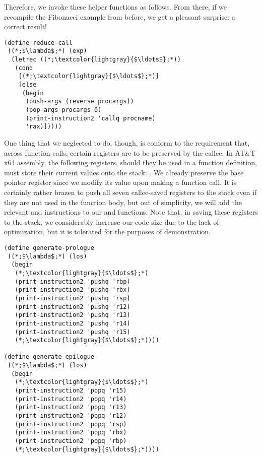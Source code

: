 Therefore, we invoke these helper functions as follows. From there, if we recompile the Fibonacci example from before, we get a pleasant surprise: a correct result!

\begin{cl}[]{}\begin{lstlisting}[language=MyScheme]
(define reduce-call
 ((*;$\lambda$;*) (exp)
  (letrec ((*;\textcolor{lightgray}{$\ldots$};*))
   (cond
    [(*;\textcolor{lightgray}{$\ldots$};*)]
    [else 
     (begin
      (push-args (reverse procargs))
      (pop-args procargs 0)
      (print-instruction2 'callq procname)
      'rax)]))))
\end{lstlisting}\end{cl}

One thing that we neglected to do, though, is conform to the requirement that, across function calls, certain registers are to be preserved by the callee. In AT\&T x64 assembly, the following registers, should they be used in a function definition, must store their current values onto the stack: . We already preserve the base pointer register since we modify its value upon making a function call. It is certainly rather brazen to push all seven callee-saved registers to the stack even if they are not used in the function body, but out of simplicity, we will add the relevant  and  instructions to our  and  functions. Note that, in saving these registers to the stack, we considerably increase our code size due to the lack of optimization, but it is tolerated for the purposes of demonstration.

\begin{cl}[]{}
\begin{lstlisting}[language=MyScheme]
(define generate-prologue
 ((*;$\lambda$;*) (los)
  (begin
   (*;\textcolor{lightgray}{$\ldots$};*)
   (print-instruction2 'pushq 'rbp)
   (print-instruction2 'pushq 'rbx)
   (print-instruction2 'pushq 'rsp)
   (print-instruction2 'pushq 'r12)
   (print-instruction2 'pushq 'r13)
   (print-instruction2 'pushq 'r14)
   (print-instruction2 'pushq 'r15)
   (*;\textcolor{lightgray}{$\ldots$};*))))

(define generate-epilogue
 ((*;$\lambda$;*) (los)
  (begin
   (*;\textcolor{lightgray}{$\ldots$};*)      
   (print-instruction2 'popq 'r15)
   (print-instruction2 'popq 'r14)
   (print-instruction2 'popq 'r13)
   (print-instruction2 'popq 'r12)
   (print-instruction2 'popq 'rsp)
   (print-instruction2 'popq 'rbx)
   (print-instruction2 'popq 'rbp)
   (*;\textcolor{lightgray}{$\ldots$};*))))
\end{lstlisting}
\end{cl}

